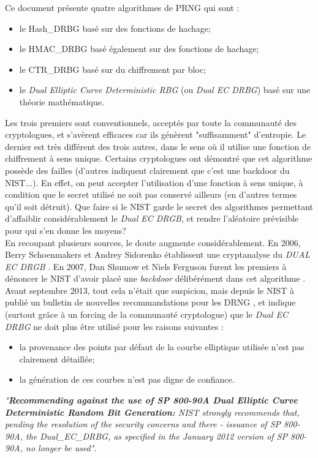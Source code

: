 	Ce document présente quatre algorithmes de PRNG qui sont :
	\begin{itemize}
		\item le Hash\_DRBG basé sur des fonctions de hachage;
		\item le HMAC\_DRBG basé également sur des fonctions de hachage;
		\item le CTR\_DRBG basé sur du chiffrement par bloc;
		\item le \textit{Dual Elliptic Curve Deterministic RBG} (ou \textit{Dual EC DRBG}) basé sur une théorie mathématique.\\
	\end{itemize}

	Les trois premiers sont conventionnels, acceptés par toute la communauté des cryptologues, et s'avèrent efficaces car ils génèrent "suffisamment" d'entropie. 	Le dernier est très différent des trois autres, dans le sens où il utilise une fonction de chiffrement à sens unique. Certains cryptologues ont démontré que cet algorithme possède des failles (d'autres indiquent clairement que c'est une backdoor du NIST...). En effet, on peut accepter l'utilisation d'une fonction à sens unique, à condition que le secret utilisé ne soit pas conservé ailleurs (en d'autres termes qu'il soit détruit). Que faire si le NIST garde le secret des algorithmes permettant d'affaiblir considérablement le \textit{Dual EC DRGB}, et rendre l'aléatoire prévisible pour qui s'en donne les moyens?\\

	En recoupant plusieurs sources, le doute augmente considérablement.	En 2006, Berry Schoenmakers et Andrey Sidorenko établissent une cryptanalyse du \textit{DUAL EC DRGB} \cite{dualecrbg2006berry}. En 2007, Dan Shumow et Niels Ferguson furent les premiers à dénoncer le NIST d'avoir placé une \textit{backdoor} délibérément dans cet algorithme \cite{shumow2007nist}.\\
	
	Avant septembre 2013, tout cela n'était que suspicion, mais depuis le NIST à publié un bulletin de nouvelles recommandations pour les DRNG \cite{newRecomendingNist}, et indique (surtout grâce à un forcing de la communauté cryptologue) que le \textit{Dual EC DRBG} ne doit plus être utilisé pour les raisons suivantes :
	\begin{itemize}
		\item la provenance des points par défaut de la courbe elliptique utilisée n'est pas clairement détaillée;
		\item la génération de ces courbes n'est pas digne de confiance.\\
	\end{itemize}
	\textit{"\textbf{Recommending against the use of SP 800-90A Dual Elliptic Curve Deterministic Random Bit Generation:} NIST strongly recommends that, pending the resolution of the security concerns and there - issuance of SP 800-90A, the Dual\_EC\_DRBG, as specified in the January 2012 version of SP 800-90A, no longer be used"}.\\

